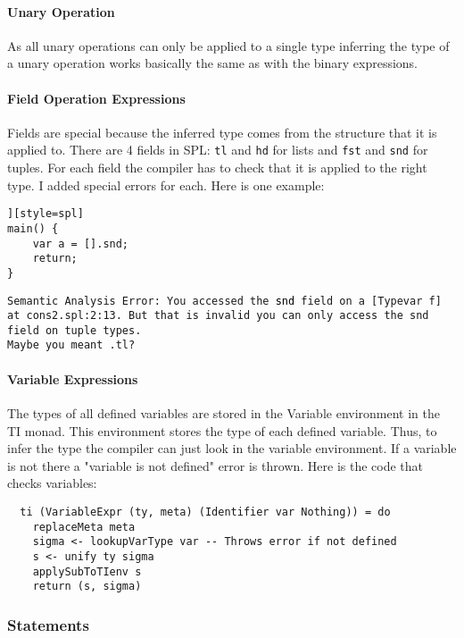 \documentclass{report}
\begin{document}
\paragraph{Unary Operation} As all unary operations can only be applied to a single type inferring the type of a unary operation works basically the same as with the binary expressions.

\paragraph{Field Operation Expressions} 

Fields are special because the inferred type comes from the structure that it is applied to.
There are 4 fields in SPL: \texttt{tl} and \texttt{hd} for lists and \texttt{fst} and \texttt{snd} for tuples. For each field the compiler has to check that it is applied to the right type. I added special errors for each. Here is one example:

\begin{lstlisting}][style=spl]
main() {
    var a = [].snd;
    return;
}
\end{lstlisting}

\noindent\texttt{\textcolor{error}{Semantic Analysis Error: You accessed the \textcolor{black}{snd} field on a \textcolor{type}{[Typevar f]} at \textcolor{filename}{cons2.spl:2:13}.} But that is invalid you can only access the snd field on tuple types.\\
Maybe you meant .tl?
}

\paragraph{Variable Expressions}

The types of all defined variables are stored in the Variable environment in the TI monad. This environment stores the type of each defined variable. Thus, to infer the type the compiler can just look in the variable environment. If a variable is not there a "variable is not defined" error is thrown. Here is the code that checks variables:

\begin{verbatim}
  ti (VariableExpr (ty, meta) (Identifier var Nothing)) = do
    replaceMeta meta
    sigma <- lookupVarType var -- Throws error if not defined
    s <- unify ty sigma
    applySubToTIenv s
    return (s, sigma)
\end{verbatim}

\subsubsection{Statements}
\end{document}
